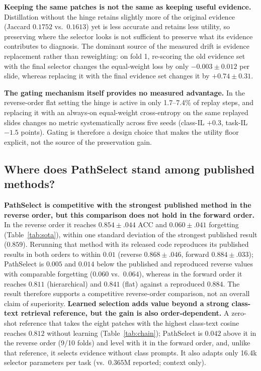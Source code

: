 \documentclass{article}
\begin{document}
\textbf{Keeping the same patches is not the same as keeping useful evidence.} Distillation without the hinge retains slightly more of the original evidence (Jaccard $0.1752$ vs.\ $0.1613$) yet is less accurate and retains less utility, so preserving where the selector looks is not sufficient to preserve what its evidence contributes to diagnosis. The dominant source of the measured drift is evidence replacement rather than reweighting: on fold 1, re-scoring the old evidence set with the final selector changes the equal-weight loss by only $-0.003{\pm}0.012$ per slide, whereas replacing it with the final evidence set changes it by $+0.74{\pm}0.31$.

\textbf{The gating mechanism itself provides no measured advantage.} In the reverse-order flat setting the hinge is active in only 1.7--7.4\% of replay steps, and replacing it with an always-on equal-weight cross-entropy on the same replayed slides changes no metric systematically across five seeds (class-IL $+0.3$, task-IL $-1.5$ points). Gating is therefore a design choice that makes the utility floor explicit, not the source of the preservation gain.

\subsection{Where does PathSelect stand among published methods?}
\label{ssec:sota}

\textbf{PathSelect is competitive with the strongest published method in the reverse order, but this comparison does not hold in the forward order.} In the reverse order it reaches $0.854{\pm}.044$ ACC and $0.060{\pm}.041$ forgetting (Table~\ref{tab:sota}), within one standard deviation of the strongest published result ($0.859$). Rerunning that method with its released code reproduces its published results in both orders to within $0.01$ (reverse $0.868{\pm}.046$, forward $0.884{\pm}.033$); PathSelect is $0.005$ and $0.014$ below the published and reproduced reverse values with comparable forgetting ($0.060$ vs.\ $0.064$), whereas in the forward order it reaches $0.811$ (hierarchical) and $0.841$ (flat) against a reproduced $0.884$. The result therefore supports a competitive reverse-order comparison, not an overall claim of superiority. \textbf{Learned selection adds value beyond a strong class-text retrieval reference, but the gain is also order-dependent.} A zero-shot reference that takes the eight patches with the highest class-text cosine reaches $0.812$ without learning (Table~\ref{tab:chain}); PathSelect is $0.042$ above it in the reverse order (9/10 folds) and level with it in the forward order, and, unlike that reference, it selects evidence without class prompts. It also adapts only 16.4k selector parameters per task (vs.\ $0.365$M reported; context only).
\end{document}
